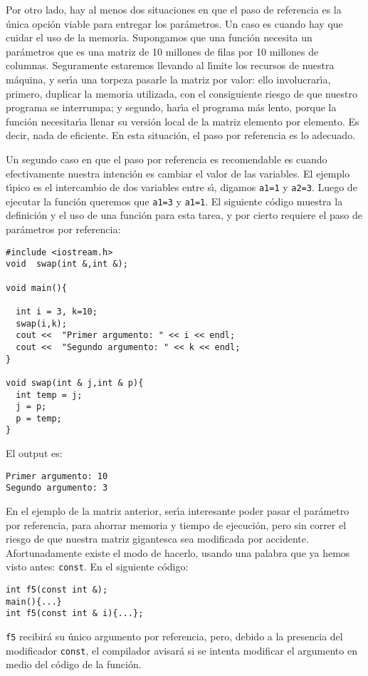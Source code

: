 \begin{enumerate}
Por otro lado, hay al menos dos situaciones en que el
paso de referencia es la \'unica opci\'on viable para entregar los
par\'ametros. Un caso es cuando hay que cuidar el uso de la
memoria. Supongamos que una funci\'on necesita un par\'ametros que es
una matriz de 10 millones de filas por 10 millones de
columnas. Seguramente estaremos llevando al l\'{\i}mite los recursos
de nuestra m\'aquina, y ser\'{\i}a una torpeza pasarle la matriz por
valor: ello involucrar\'{\i}a, primero, duplicar la memoria utilizada,
con el consiguiente riesgo de que nuestro programa se interrumpa; y
segundo, har\'{\i}a el programa m\'as lento, porque la funci\'on
necesitar\'{\i}a llenar su versi\'on local de la matriz elemento por
elemento. Es decir, nada de eficiente. En esta situaci\'on, el paso
por referencia es lo adecuado.

Un segundo caso en que el paso por referencia es recomendable es
cuando efectivamente nuestra intenci\'on es cambiar el valor de las
variables. El ejemplo t\'{\i}pico es el intercambio de dos variables
entre s\'{\i}, digamos \verb+a1=1+ y \verb+a2=3+. 
Luego de ejecutar la funci{\'o}n queremos que \verb+a1=3+ y \verb+a1=1+.
El siguiente c\'odigo muestra la definici\'on y el uso de una
funci\'on  para esta tarea, y por cierto requiere el paso
de par\'ametros por referencia:
\begin{verbatim}
#include <iostream.h>
void  swap(int &,int &);

void main(){

  int i = 3, k=10; 
  swap(i,k);
  cout <<  "Primer argumento: " << i << endl;
  cout <<  "Segundo argumento: " << k << endl;
}

void swap(int & j,int & p){
  int temp = j;
  j = p;
  p = temp;
}
\end{verbatim}
El output es:
\begin{verbatim}
Primer argumento: 10
Segundo argumento: 3
\end{verbatim}
\end{enumerate}

En el ejemplo de la matriz anterior, ser\'{\i}a interesante poder
pasar el par\'ametro por referencia, para ahorrar memoria y tiempo de
ejecuci\'on, pero sin correr el riesgo de que nuestra matriz
gigantesca sea modificada por accidente. Afortunadamente existe el
modo de hacerlo, usando una palabra que ya hemos visto antes:
\verb+const+. En el siguiente c\'odigo:
\begin{verbatim}
int f5(const int &);
main(){...}
int f5(const int & i){...};
\end{verbatim}
\verb+f5+ recibir\'a su \'unico argumento por referencia, pero, debido
a la presencia del modificador \verb+const+, el compilador  
avisar\'a si se intenta modificar el argumento en
medio del c\'odigo de la funci\'on.


